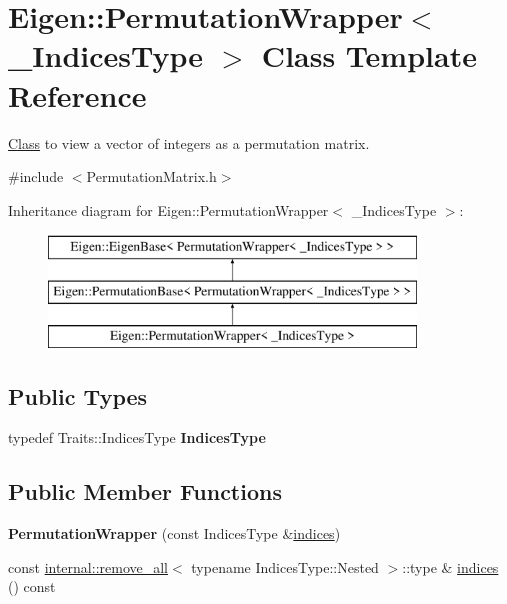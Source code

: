 \hypertarget{class_eigen_1_1_permutation_wrapper}{}\section{Eigen\+::Permutation\+Wrapper$<$ \+\_\+\+Indices\+Type $>$ Class Template Reference}
\label{class_eigen_1_1_permutation_wrapper}


\mbox{\hyperlink{struct_class}{Class}} to view a vector of integers as a permutation matrix.  




{\ttfamily \#include $<$Permutation\+Matrix.\+h$>$}

Inheritance diagram for Eigen\+::Permutation\+Wrapper$<$ \+\_\+\+Indices\+Type $>$\+:\begin{figure}[H]
\begin{center}
\leavevmode
\includegraphics[height=3.000000cm]{class_eigen_1_1_permutation_wrapper}
\end{center}
\end{figure}
\subsection*{Public Types}
\begin{DoxyCompactItemize}
\item 
\mbox{\label{class_eigen_1_1_permutation_wrapper_adc09c5cef3f47c99f148b48cbac10942}} 
typedef Traits\+::\+Indices\+Type {\bfseries Indices\+Type}
\end{DoxyCompactItemize}
\subsection*{Public Member Functions}
\begin{DoxyCompactItemize}
\item 
\mbox{\label{class_eigen_1_1_permutation_wrapper_a39db758eb2dc23e57fadc572d50137f6}} 
{\bfseries Permutation\+Wrapper} (const Indices\+Type \&\mbox{\hyperlink{class_eigen_1_1_permutation_wrapper_a88ae93cc14c136b2eec4a286b4c10c34}{indices}})
\item 
const \mbox{\hyperlink{struct_eigen_1_1internal_1_1remove__all}{internal\+::remove\+\_\+all}}$<$ typename Indices\+Type\+::\+Nested $>$\+::type \& \mbox{\hyperlink{class_eigen_1_1_permutation_wrapper_a88ae93cc14c136b2eec4a286b4c10c34}{indices}} () const
\end{DoxyCompactItemize}
